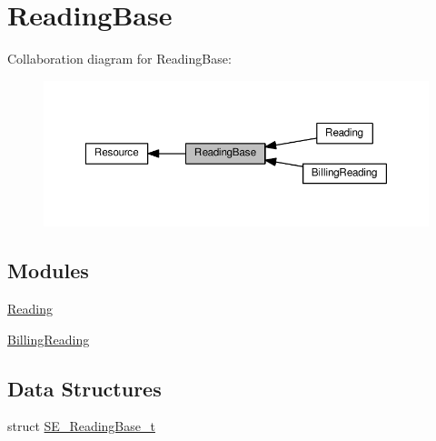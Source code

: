 \hypertarget{group__ReadingBase}{}\section{Reading\+Base}
\label{group__ReadingBase}
Collaboration diagram for Reading\+Base\+:\nopagebreak
\begin{figure}[H]
\begin{center}
\leavevmode
\includegraphics[width=350pt]{group__ReadingBase}
\end{center}
\end{figure}
\subsection*{Modules}
\begin{DoxyCompactItemize}
\item 
\hyperlink{group__Reading}{Reading}
\item 
\hyperlink{group__BillingReading}{Billing\+Reading}
\end{DoxyCompactItemize}
\subsection*{Data Structures}
\begin{DoxyCompactItemize}
\item 
struct \hyperlink{structSE__ReadingBase__t}{S\+E\+\_\+\+Reading\+Base\+\_\+t}
\end{DoxyCompactItemize}
